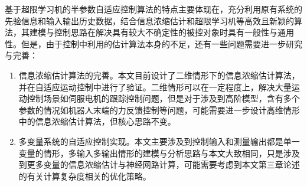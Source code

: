 \begin{conclusion}
基于超限学习机的半参数自适应控制算法的特点主要体现在，充分利用原有系统的先验信息和输入输出历史数据，结合信息浓缩估计和超限学习机等高效且新颖的算法，其建模与控制思路在解决具有较大不确定性的被控对象时具有一般性与通用性。但是，由于控制中利用的估计算法本身的不足，还有一些问题需要进一步研究与完善：
\begin{enumerate}
\item 信息浓缩估计算法的完善。本文目前设计了二维情形下的信息浓缩估计算法，并在自适应运动控制中进行了验证。二维情形可以在一定程度上，解决大量运动控制场景如伺服电机的跟踪控制问题，但是对于涉及到高阶模型，含有多个参数的情况如机器人末端的力反馈控制等问题，可能需要进一步设计高维情形中的信息浓缩估计算法，但核心思路不变。
\item 多变量系统的自适应控制实现。本文主要涉及到控制输入和测量输出都是单一变量的情形，多输入多输出情形的建模与分析思路与本文大致相同，只是涉及到更多变量的信息浓缩估计与神经网路计算，可能需要考虑到本文第三章论述的有关计算复杂度相关的优化策略。
\end{enumerate}
\end{conclusion}